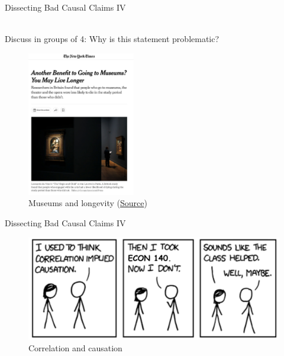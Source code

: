 \documentclass[11pt]{beamer}
\begin{document}
\begin{frame}{Dissecting Bad Causal Claims IV}

\begin{alertblock} {\centering \vspace{-1.5ex} \\ Discuss in groups of 4: Why is this statement problematic?  \\ \vspace{-1.5ex} } \end{alertblock}

\begin{figure}[h!t]
    \centering    \includegraphics[width=0.42\textwidth]{figures/s1_nytimes.png}
    \caption{Museums and longevity (\href{https://www.nytimes.com/2019/12/22/us/arts-health-effects-ucl-study.html}{Source})}
    \label{fig:museum}
\end{figure}

\end{frame}








\begin{frame}{Dissecting Bad Causal Claims IV}

\begin{figure}[h!t]
    \centering    \includegraphics[width=1.0\textwidth]{figures/s1_meme.png}
    \caption{Correlation and causation}
    \label{fig:meme}
\end{figure}

\end{frame}
\end{document}
